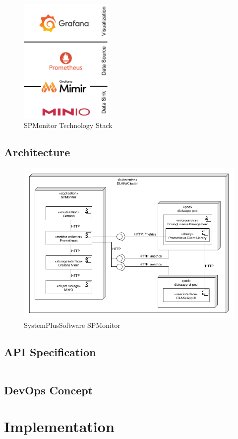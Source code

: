 \begin{figure}
	\centering
	\includegraphics[width=0.4\textwidth]{figures/spmonitor_tech_stack.png}
	\caption{SPMonitor Technology Stack}
	\label{fig:spmonitor_tech_stack}
\end{figure}

\subsection{Architecture}


\begin{figure}[h]
	\centering
	\includegraphics[width=\textwidth]{figures/sps_spmonitor.png}
	\caption{SystemPlusSoftware SPMonitor}
	\label{fig:sps_spmonitor}
\end{figure}

\subsection{API Specification}

\inputminted{yaml}{listings/rest_specification_drivinglicensemanagement.yaml}

\subsection{DevOps Concept}

\section{Implementation}